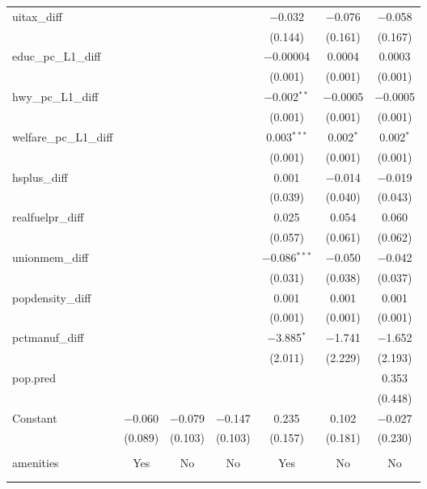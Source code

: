 \begin{table}[!htbp]
\begin{tabular}{@{\extracolsep{5pt}}lcccccc}
  uitax\_diff &  &  &  & $-$0.032 & $-$0.076 & $-$0.058 \\ 
  &  &  &  & (0.144) & (0.161) & (0.167) \\ 
  educ\_pc\_L1\_diff &  &  &  & $-$0.00004 & 0.0004 & 0.0003 \\ 
  &  &  &  & (0.001) & (0.001) & (0.001) \\ 
  hwy\_pc\_L1\_diff &  &  &  & $-$0.002$^{**}$ & $-$0.0005 & $-$0.0005 \\ 
  &  &  &  & (0.001) & (0.001) & (0.001) \\ 
  welfare\_pc\_L1\_diff &  &  &  & 0.003$^{***}$ & 0.002$^{*}$ & 0.002$^{*}$ \\ 
  &  &  &  & (0.001) & (0.001) & (0.001) \\ 
  hsplus\_diff &  &  &  & 0.001 & $-$0.014 & $-$0.019 \\ 
  &  &  &  & (0.039) & (0.040) & (0.043) \\ 
  realfuelpr\_diff &  &  &  & 0.025 & 0.054 & 0.060 \\ 
  &  &  &  & (0.057) & (0.061) & (0.062) \\ 
  unionmem\_diff &  &  &  & $-$0.086$^{***}$ & $-$0.050 & $-$0.042 \\ 
  &  &  &  & (0.031) & (0.038) & (0.037) \\ 
  popdensity\_diff &  &  &  & 0.001 & 0.001 & 0.001 \\ 
  &  &  &  & (0.001) & (0.001) & (0.001) \\ 
  pctmanuf\_diff &  &  &  & $-$3.885$^{*}$ & $-$1.741 & $-$1.652 \\ 
  &  &  &  & (2.011) & (2.229) & (2.193) \\ 
  pop.pred &  &  &  &  &  & 0.353 \\ 
  &  &  &  &  &  & (0.448) \\ 
  Constant & $-$0.060 & $-$0.079 & $-$0.147 & 0.235 & 0.102 & $-$0.027 \\ 
  & (0.089) & (0.103) & (0.103) & (0.157) & (0.181) & (0.230) \\ 
 \hline \\[-1.8ex] 
amenities & Yes & No & No & Yes & No & No \\ 
\hline \\[-1.8ex] 
\hline 
\hline \\[-1.8ex] 
\end{tabular} 
\end{table} 
